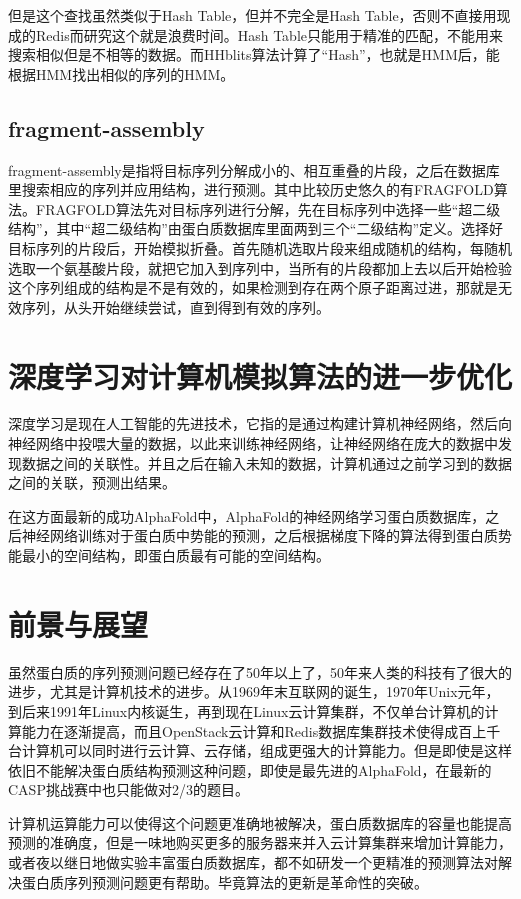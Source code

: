 \documentclass{article}
\begin{document}
但是这个查找虽然类似于Hash Table，但并不完全是Hash Table，否则不直接用现成的Redis而研究这个就是浪费时间。Hash Table只能用于精准的匹配，不能用来搜索相似但是不相等的数据。而HHblits算法计算了“Hash”，也就是HMM后，能根据HMM找出相似的序列的HMM。

\subsection{fragment-assembly}

fragment-assembly是指将目标序列分解成小的、相互重叠的片段，之后在数据库里搜索相应的序列并应用结构，进行预测。其中比较历史悠久的有FRAGFOLD算法。FRAGFOLD算法先对目标序列进行分解，先在目标序列中选择一些“超二级结构”，其中“超二级结构”由蛋白质数据库里面两到三个“二级结构”定义。选择好目标序列的片段后，开始模拟折叠。首先随机选取片段来组成随机的结构，每随机选取一个氨基酸片段，就把它加入到序列中，当所有的片段都加上去以后开始检验这个序列组成的结构是不是有效的，如果检测到存在两个原子距离过进，那就是无效序列，从头开始继续尝试，直到得到有效的序列。

\section{深度学习对计算机模拟算法的进一步优化}

深度学习是现在人工智能的先进技术，它指的是通过构建计算机神经网络，然后向神经网络中投喂大量的数据，以此来训练神经网络，让神经网络在庞大的数据中发现数据之间的关联性。并且之后在输入未知的数据，计算机通过之前学习到的数据之间的关联，预测出结果。

在这方面最新的成功AlphaFold中，AlphaFold的神经网络学习蛋白质数据库，之后神经网络训练对于蛋白质中势能的预测，之后根据梯度下降的算法得到蛋白质势能最小的空间结构，即蛋白质最有可能的空间结构。

\section{前景与展望}

虽然蛋白质的序列预测问题已经存在了50年以上了，50年来人类的科技有了很大的进步，尤其是计算机技术的进步。从1969年末互联网的诞生，1970年Unix元年，到后来1991年Linux内核诞生，再到现在Linux云计算集群，不仅单台计算机的计算能力在逐渐提高，而且OpenStack云计算和Redis数据库集群技术使得成百上千台计算机可以同时进行云计算、云存储，组成更强大的计算能力。但是即使是这样依旧不能解决蛋白质结构预测这种问题，即使是最先进的AlphaFold，在最新的CASP挑战赛中也只能做对2/3的题目。

计算机运算能力可以使得这个问题更准确地被解决，蛋白质数据库的容量也能提高预测的准确度，但是一味地购买更多的服务器来并入云计算集群来增加计算能力，或者夜以继日地做实验丰富蛋白质数据库，都不如研发一个更精准的预测算法对解决蛋白质序列预测问题更有帮助。毕竟算法的更新是革命性的突破。
\end{document}
